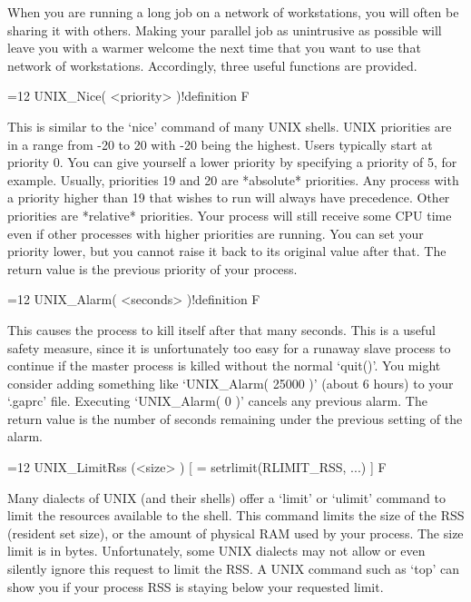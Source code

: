 
When you are running a long job on a network of workstations, you will
often be sharing it with others.  Making your parallel job as unintrusive
as possible will leave you with a warmer welcome the next time that
you want to use that network of workstations.  Accordingly, three
useful functions are provided.

{=12
\>UNIX_Nice( <priority> )!{definition} F
\par}

This is similar to the `nice' command of many UNIX shells.  UNIX
priorities are in a range from -20 to 20 with -20 being the highest.
Users typically start at priority 0.  You can give yourself a lower
priority by specifying a priority of 5, for example.  Usually,
priorities 19 and 20 are *absolute* priorities.  Any process with
a priority higher than 19 that wishes to run will always have precedence.
Other priorities are *relative* priorities.  Your process will still
receive some CPU time even if other processes with higher priorities
are running.  You can set your priority lower, but you cannot raise
it back to its original value after that.  The return value is the
previous priority of your process.

{=12
\>UNIX_Alarm( <seconds> )!{definition} F
\par}

This causes the process to kill itself after that many seconds.
This is a useful safety measure, since it is unfortunately too easy
for a runaway slave process to continue if the master process is
killed without the normal `quit()'.  You might consider adding
something like `UNIX_Alarm( 25000 )' (about 6 hours) to your `.gaprc'
file.  Executing `UNIX_Alarm( 0 )' cancels any previous alarm.
The return value is the number of seconds remaining under the previous
setting of the alarm.

{=12
\>UNIX_LimitRss (<size> ) [ = setrlimit(RLIMIT_RSS, ...) ] F
\par}

Many dialects of UNIX (and their shells) offer a `limit' or `ulimit'
command to limit the resources available to the shell.  This command
limits the size of the RSS (resident set size), or the
amount of physical RAM used by your process.  The size limit is in
bytes.  Unfortunately, some UNIX dialects may not allow or even
silently ignore this request to limit the RSS.  A UNIX command
such as `top' can show you if your process RSS is staying below
your requested limit.

